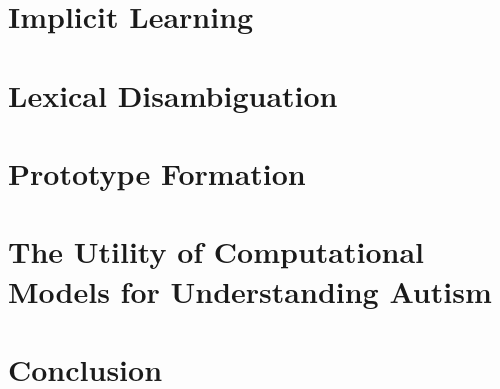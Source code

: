 \documentclass[man]{apa}
\begin{document}
% 
% 


\section{Implicit Learning}
\label{section:implicit}




\section{Lexical Disambiguation}
\label{section:lexical}




\section{Prototype Formation}
\label{section:prototype}




% 
% 


\section{The Utility of Computational Models for Understanding Autism}
\label{section:modeling}




\section{Conclusion}
\label{section:conclusion}





\end{document}
